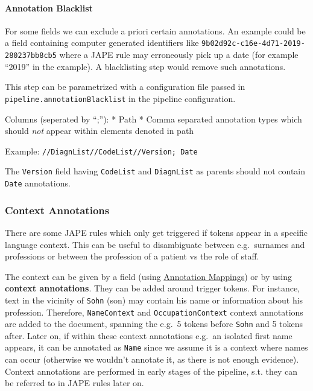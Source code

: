 \paragraph{Annotation Blacklist}\label{annotation-blacklist}

For some fields we can exclude a priori certain annotations. An example
could be a field containing computer generated identifiers like
\texttt{9b02d92c-c16e-4d71-2019-280237bb8cb5} where a JAPE rule may
erroneously pick up a date (for example ``2019'' in the example). A
blacklisting step would remove such annotations.

This step can be parametrized with a configuration file passed in
\texttt{pipeline.annotationBlacklist} in the pipeline configuration.

Columns (seperated by ``;''): * Path * Comma separated annotation types
which should \emph{not} appear within elements denoted in path

Example: \texttt{//DiagnList//CodeList//Version;\ Date}

The \texttt{Version} field having \texttt{CodeList} and
\texttt{DiagnList} as parents should not contain \texttt{Date}
annotations.

\subsubsection{Context Annotations}\label{context-annotations}

There are some JAPE rules which only get triggered if tokens appear in a
specific language context. This can be useful to disambiguate between
e.g.~surnames and professions or between the profession of a patient vs
the role of staff.

The context can be given by a field (using
\hyperref[field-normalization-field-annotation-mapping]{Annotation Mappings}) or by using
\textbf{context annotations}. They can be added around trigger tokens.
For instance, text in the vicinity of \texttt{Sohn} (son) may contain
his name or information about his profession. Therefore,
\texttt{NameContext} and \texttt{OccupationContext} context annotations
are added to the document, spanning the e.g.~5 tokens before
\texttt{Sohn} and 5 tokens after. Later on, if within these context
annotations e.g.~an isolated first name appears, it can be annotated as
\texttt{Name} since we assume it is a context where names can occur
(otherwise we wouldn't annotate it, as there is not enough evidence).
Context annotations are performed in early stages of the pipeline, s.t.
they can be referred to in JAPE rules later on.

